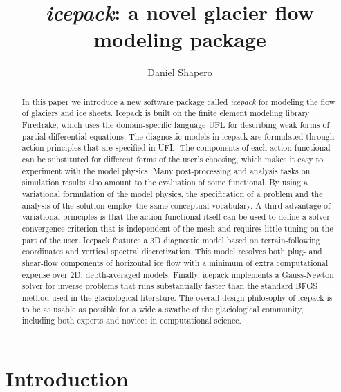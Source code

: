 \documentclass{article}
\title{\emph{icepack}: a novel glacier flow modeling package}
\author{Daniel Shapero}
\date{}
\theoremstyle{definition}
\theoremstyle{plain}
\begin{document}
\tableofcontents
\newpage

\maketitle

\begin{abstract}
In this paper we introduce a new software package called \emph{icepack} for modeling the flow of glaciers and ice sheets.
Icepack is built on the finite element modeling library Firedrake, which uses the domain-specific language UFL for describing weak forms of partial differential equations.
The diagnostic models in icepack are formulated through action principles that are specified in UFL.
The components of each action functional can be substituted for different forms of the user's choosing, which makes it easy to experiment with the model physics.
Many post-processing and analysis tasks on simulation results also amount to the evaluation of some functional.
By using a variational formulation of the model physics, the specification of a problem and the analysis of the solution employ the same conceptual vocabulary.
A third advantage of variational principles is that the action functional itself can be used to define a solver convergence criterion that is independent of the mesh and requires little tuning on the part of the user.
Icepack features a 3D diagnostic model based on terrain-following coordinates and vertical spectral discretization.
This model resolves both plug- and shear-flow components of horizontal ice flow with a minimum of extra computational expense over 2D, depth-averaged models.
Finally, icepack implements a Gauss-Newton solver for inverse problems that runs substantially faster than the standard BFGS method used in the glaciological literature.
The overall design philosophy of icepack is to be as usable as possible for a wide a swathe of the glaciological community, including both experts and novices in computational science.
\end{abstract}

\section{Introduction}
\end{document}
